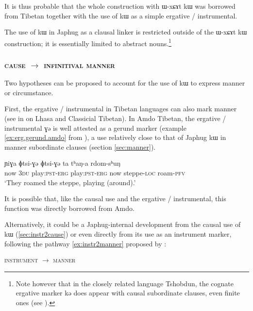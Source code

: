 \documentclass[oldfontcommands,oneside,a4paper,11pt]{article}
\newcommand{\ipa}[1]{{\phon #1}} %
\begin{document}
It is thus probable that the whole construction with \ipa{ɯ-xɕɤt kɯ} was borrowed from Tibetan together with the use of \ipa{kɯ} as a simple ergative / instrumental.

The use of  \ipa{kɯ} in Japhug as a clausal linker is restricted outside of the  \ipa{ɯ-xɕɤt kɯ} construction; it is essentially limited to  abstract nouns.\footnote{Note however that in the closely related language Tshobdun, the cognate ergative marker \ipa{kə} does appear with causal subordinate clauses, even finite ones (see \citealt[479]{sun12complementation}).}
 
 \subsubsection{\textsc{cause} $\rightarrow$ \textsc{infinitival manner}}
Two hypotheses can be proposed to account for the  use of  \ipa{kɯ} to express manner or circumstance.

First,   the ergative / instrumental in Tibetan languages can also mark manner (see in  \citealt[128]{tournadre96erg} on Lhasa and Classicial Tibetan). In Amdo Tibetan, the ergative / instrumental \ipa{ɣə} is well attested as a gerund marker (example \ref{ex:erg.gerund.amdo} from \citealt[162; 167]{haller04themchen}), a use relatively close to that of Japhug \ipa{kɯ} in manner subordinate clauses (section \ref{sec:manner}).

 \begin{exe} 
\ex \label{ex:erg.gerund.amdo}
\gll   \ipa{ta} 	\ipa{ɲiɣa} 	\ipa{ɸtsi-ɣə} 	\ipa{ɸtsi-ɣə} 	\ipa{ta} 	\ipa{tʰaŋ-a} 	\ipa{rdom-sʰuŋ}  \\
now \textsc{3du} play:\textsc{pst}-\textsc{erg} play:\textsc{pst}-\textsc{erg} now steppe-\textsc{loc} roam-\textsc{pfv} \\
\glt  `They roamed the steppe, playing (around).'
\end{exe}  

It is possible that, like the causal use and the ergative / instrumental, this function was directly borrowed from Amdo.

Alternatively, it could be a Japhug-internal development from the causal use of \ipa{kɯ}  (\ref{sec:instr2cause}) or even directly from its use as an instrument marker, following the pathway \ref{ex:instr2manner} proposed by \citet[180]{heine-kuteva02}:
   \begin{exe}
\ex \label{ex:instr2manner}
\glt \textsc{instrument} $\rightarrow$ \textsc{manner} 
\end{exe}
\end{document}
